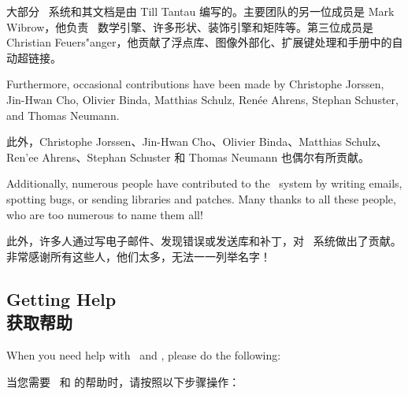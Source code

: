 大部分 \pgfname\ 系统和其文档是由 Till Tantau 编写的。主要团队的另一位成员是 Mark Wibrow，他负责 \pgfname\ 数学引擎、许多形状、装饰引擎和矩阵等。第三位成员是 Christian Feuers"anger，他贡献了浮点库、图像外部化、扩展键处理和手册中的自动超链接。

Furthermore, occasional contributions have been made by Christophe Jorssen,
Jin-Hwan Cho, Olivier Binda, Matthias Schulz, Ren\'ee Ahrens, Stephan Schuster,
and Thomas Neumann.

此外，Christophe Jorssen、Jin-Hwan Cho、Olivier Binda、Matthias Schulz、Ren'ee Ahrens、Stephan Schuster 和 Thomas Neumann 也偶尔有所贡献。


Additionally, numerous people have contributed to the \pgfname\ system by
writing emails, spotting bugs, or sending libraries and patches. Many thanks to
all these people, who are too numerous to name them all!

此外，许多人通过写电子邮件、发现错误或发送库和补丁，对 \pgfname\ 系统做出了贡献。非常感谢所有这些人，他们太多，无法一一列举名字！


\subsection{Getting Help\\获取帮助}

When you need help with \pgfname\ and \tikzname, please do the following:

当您需要 \pgfname\ 和 \tikzname 的帮助时，请按照以下步骤操作：


